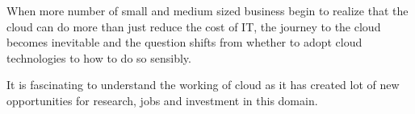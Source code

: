 When more number of small and medium sized business begin to realize that the cloud can do more than just reduce the cost of IT, the journey to the cloud becomes inevitable and the question shifts from whether to adopt cloud technologies to how to do so sensibly.

It is fascinating to understand the working of cloud as it has created lot of new opportunities for research, jobs and investment in this domain.